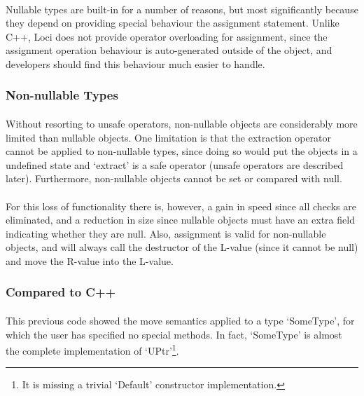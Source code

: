 \documentclass[12pt,twoside,notitlepage]{report}
\begin{document}
\paragraph{}
Nullable types are built-in for a number of reasons, but most significantly because they depend on providing special behaviour the assignment statement. Unlike C++, Loci does not provide operator overloading for assignment, since the assignment operation behaviour is auto-generated outside of the object, and developers should find this behaviour much easier to handle.

\subsubsection{Non-nullable Types}

\paragraph{}
Without resorting to unsafe operators, non-nullable objects are considerably more limited than nullable objects. One limitation is that the extraction operator cannot be applied to non-nullable types, since doing so would put the objects in a undefined state and `extract' is a safe operator (unsafe operators are described later). Furthermore, non-nullable objects cannot be set or compared with null.

\paragraph{}
For this loss of functionality there is, however, a gain in speed since all checks are eliminated, and a reduction in size since nullable objects must have an extra field indicating whether they are null. Also, assignment is valid for non-nullable objects, and will always call the destructor of the L-value (since it cannot be null) and move the R-value into the L-value.

\subsubsection{Compared to C++}

\paragraph{}
This previous code showed the move semantics applied to a type `SomeType', for which the user has specified no special methods. In fact, `SomeType' is almost the complete implementation of `UPtr'\footnote{It is missing a trivial `Default' constructor implementation.}.
\end{document}
